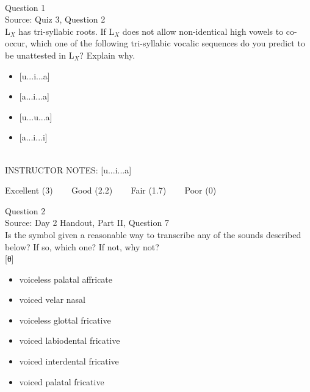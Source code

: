 \documentclass[12pt]{article}
\begin{document}
\begin{center}
\textbf{{\color{red}{\HUGE END OF EXAM}}}\\

\end{center}
\newpage

\begin{center}
\textbf{{\color{blue}{\HUGE START OF EXAM\\}}}

\textbf{{\color{blue}{\HUGE Student ID: 3773\\}}}

\textbf{{\color{blue}{\HUGE 12:45 - 1:00 PM\\}}}

\end{center}
\newpage

{\large Question 1}\\

Source: Quiz 3, Question 2\\

L$_X$ has tri-syllabic roots. If L$_X$ does not allow non-identical high vowels to co-occur, which one of the following tri-syllabic vocalic sequences do you predict to be unattested in L$_X$? Explain why.\\

\begin{itemize} \item {[u...i...a]} \item {[a...i...a]} \item {[u...u...a]} \item {[a...i...i]} \end{itemize}


~\\
INSTRUCTOR NOTES: [u...i...a]


\vfill
Excellent (3) ~~~ Good (2.2) ~~~ Fair (1.7) ~~~ Poor (0)
\newpage

{\large Question 2}\\

Source: Day 2 Handout, Part II, Question 7\\

Is the symbol given a reasonable way to transcribe any of the sounds described below? If so, which one? If not, why not?\\

{[θ]}

\begin{itemize} \item voiceless palatal affricate \item voiced velar nasal \item voiceless glottal fricative \item voiced labiodental fricative \item voiced interdental fricative \item voiced palatal fricative \end{itemize}
\end{document}
